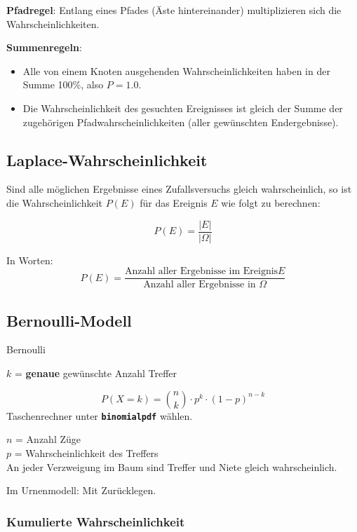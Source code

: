 \begin{multicols}{2}
\textbf{Pfadregel}:
Entlang eines Pfades (Äste hintereinander) multiplizieren sich die
Wahrscheinlichkeiten.

\textbf{Summenregeln}:
\begin{itemize}
\item Alle von einem Knoten ausgehenden Wahrscheinlichkeiten haben in
der Summe 100\%, also $P=1.0$.
\item Die Wahrscheinlichkeit des gesuchten Ereignisses ist gleich der
Summe der zugehörigen Pfadwahrscheinlichkeiten (aller gewünschten Endergebnisse).
\end{itemize}




\subsection{Laplace-Wahrscheinlichkeit}
Sind alle möglichen Ergebnisse eines Zufallsversuchs gleich
wahrscheinlich, so ist die Wahrscheinlichkeit $P(E)$ für das Ereignis
$E$ wie folgt zu berechnen:

\begin{gesetz}{}{}
$$P(E) = \frac{|E|}{|\Omega|}$$
\end{gesetz}

In Worten:
$$P(E) = \frac{\textrm{Anzahl aller Ergebnisse
im Ereignis
}E}{\textrm{Anzahl aller Ergebnisse in }\Omega}$$


\subsection{Bernoulli-Modell}
\begin{gesetz}{Bernoulli}{}

$k$ = \textbf{genaue} gewünschte Anzahl Treffer

$$P(X=k) = {n \choose k}\cdot{}p^k\cdot{}(1-p)^{n-k}$$
Taschenrechner
unter  \textbf{\texttt{binomialpdf}} wählen.

$n$ = Anzahl Züge\\
$p$ = Wahrscheinlichkeit des Treffers\\

An jeder Verzweigung im Baum sind Treffer und Niete gleich
wahrscheinlich.

Im Urnenmodell: Mit Zurücklegen.
\end{gesetz}

\subsubsection{Kumulierte Wahrscheinlichkeit}


\end{multicols}
